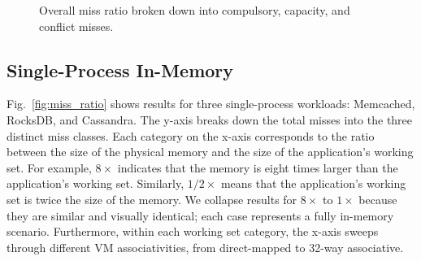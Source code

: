 \begin{figure}[t]
	\centering
	
	
	
	\caption{Overall miss ratio broken down into compulsory, capacity, and conflict misses.
		\label{fig:miss_ratio_procs}}
\end{figure}

\subsection{Single-Process In-Memory}

Fig.~\ref{fig:miss_ratio} shows results for three single-process workloads: Memcached, RocksDB, and Cassandra. The y-axis breaks down the total misses into the three distinct miss classes. Each category on the x-axis corresponds to the ratio between the size of the physical memory and the size of the application's working set. For example,  $8\times$ indicates that the memory is eight times larger than the application's working set. Similarly, $1/2\times$ means that the application's working set is twice the size of the memory. We collapse results for $8\times$ to $1\times$ because they are similar and visually identical; each case represents a fully in-memory scenario. Furthermore, within each working set category, the x-axis sweeps through different VM associativities, from direct-mapped to 32-way associative. 



